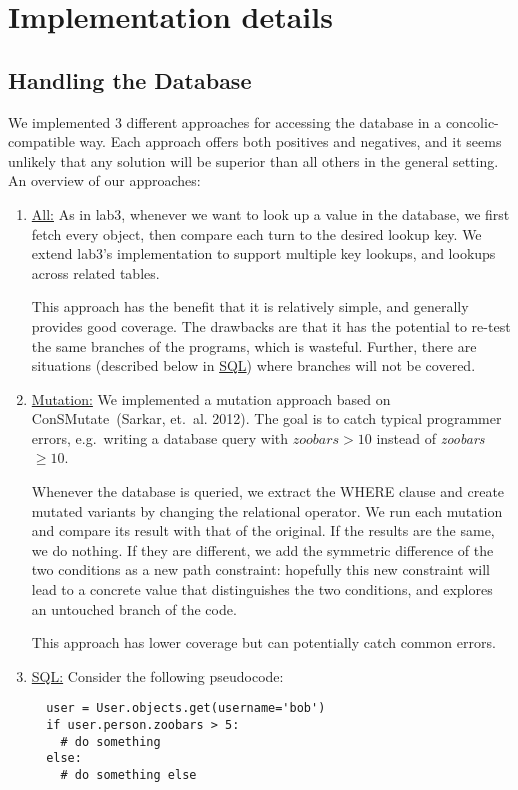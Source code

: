 \documentclass{scrartcl}
\begin{document}
\section{Implementation details}

\subsection{Handling the Database}
We implemented 3 different approaches for accessing the database in a
concolic-compatible way. Each approach offers both positives and
negatives, and it seems unlikely that any solution will be superior
than all others in the general setting. An overview of our approaches:

\begin{enumerate}
\item \underline{All:}
  As in lab3, whenever we want to look up a value
  in the database, we first fetch every object, then compare each turn to the
  desired lookup key. We extend lab3's implementation to support multiple key
  lookups, and lookups across related tables.

  This approach has the benefit that it is relatively simple, and generally
  provides good coverage. The drawbacks are that it has the potential to re-test
  the same branches of the programs, which is wasteful. Further, there are
  situations (described below in \underline{SQL}) where branches will not be
  covered.

\item \underline{Mutation:}
  We implemented a mutation approach based on
  ConSMutate~(Sarkar, et.\ al. 2012). The goal is to catch typical
  programmer errors, e.g.\ writing a database query with
  $\textit{zoobars} > 10$ instead of \textit{zoobars }$ \geq 10$.

  Whenever the database is queried, we extract the WHERE clause and
  create mutated variants by changing the relational operator. We run
  each mutation and compare its result with that of the original. If
  the results are the same, we do nothing. If they are different, we
  add the symmetric difference of the two conditions as a new path
  constraint: hopefully this new constraint will lead to a concrete
  value that distinguishes the two conditions, and explores an
  untouched branch of the code.

  This approach has lower coverage but can potentially catch common errors.

\item \underline{SQL:}
  Consider the following pseudocode:
  \begin{verbatim}
  user = User.objects.get(username='bob')
  if user.person.zoobars > 5:
    # do something
  else:
    # do something else
  \end{verbatim}


\end{enumerate}
\end{document}
